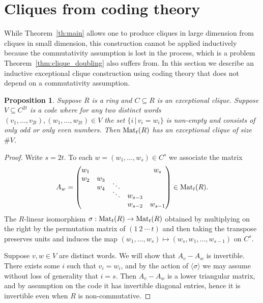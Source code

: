 \documentclass{amsart}
\theoremstyle{plain}
\newtheorem{proposition}[theorem]{Proposition}
\theoremstyle{definition}
\newcommand{\id}{\mathrm{id}}
\newcommand{\Z}{\ensuremath{\mathbb{Z}}}
\newcommand{\clq}{C}
\newcommand{\nrg}{R}
\begin{document}
\section{Cliques from coding theory}\label{sec:coding}

While Theorem~\ref{th:main} allows one to produce cliques in large dimension from cliques in small dimension, this construction cannot be applied inductively because the commutativity assumption is lost in the process, which is a problem Theorem~\ref{thm:clique_doubling} also suffers from.
In this section we describe an inductive exceptional clique construction using coding theory that does not depend on a commutativity assumption.

\begin{proposition}\label{prop:coding_inductive_step}
	Suppose \(\nrg\) is a ring and \(\clq\subseteq \nrg\) is an exceptional clique. 
	Suppose \(V\subseteq \clq^{2t}\) is a code where for any two distinct words \((v_1,\dotsc,v_{2t}),(w_1,\dotsc,w_{2t})\in V\) the set \(\{i \,|\, v_i=w_i\}\) is non-empty and consists of only odd or only even numbers.
	Then \(\textup{Mat}_{t}(\nrg)\) has an exceptional clique of size \(\#V\).
\end{proposition}
\begin{proof}
	Write \(s=2t\).
	To each \(w=(w_1,\dotsc,w_s)\in \clq^s\) we associate the matrix
	\[A_w=\begin{pmatrix} w_1 & & & & w_s\\ w_2 & w_3 \\ & w_4 & \smash{\ddots} \\ & & \smash{\ddots} & w_{s-3} \\ & & & w_{s-2} & w_{s-1} \end{pmatrix} \in \textup{Mat}_{t}(\nrg).\]
	The \(\nrg\)-linear isomorphism \(\sigma:\textup{Mat}_t(\nrg)\to\textup{Mat}_t(\nrg)\) obtained by multiplying on the right by the permutation matrix of \((1\ 2\ \dotsm\ t)\) and then taking the transpose preserves units and induces the map \((w_1,\dotsc,w_s)\mapsto(w_s,w_1,\dotsc,w_{s-1})\) on \(\clq^s\). 
	
	Suppose \(v,w\in V\) are distinct words. 
	We will show that \(A_v-A_w\) is invertible.
	There exists some \(i\) such that \(v_i=w_i\), and by the action of \(\langle\sigma\rangle\) we may assume without loss of generality that \(i=s\).
	Then \(A_v-A_w\) is a lower triangular matrix, and by assumption on the code it has invertible diagonal entries, hence it is invertible even when \(\nrg\) is non-commutative.
\end{proof}
\end{document}

